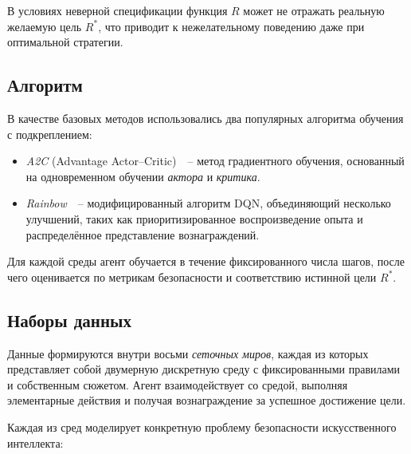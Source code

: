 В условиях неверной спецификации функция $R$ может не отражать реальную желаемую цель $R^*$, что приводит к нежелательному поведению даже при оптимальной стратегии.

\subsection{Алгоритм}

В качестве базовых методов использовались два популярных алгоритма обучения с подкреплением:
\begin{itemize}
    \item \emph{A2C} (Advantage Actor–Critic)~\cite{mnih2016a3c}~-- метод градиентного обучения, основанный на одновременном обучении \emph{актора} и \emph{критика}.
    \item \emph{Rainbow}~\cite{hessel2017rainbow}~-- модифицированный алгоритм DQN, объединяющий несколько улучшений, таких как приоритизированное воспроизведение опыта и распределённое представление вознаграждений.
\end{itemize}

Для каждой среды агент обучается в течение фиксированного числа шагов, после чего оценивается по метрикам безопасности и соответствию истинной цели $R^*$.

\subsection{Наборы данных}

Данные формируются внутри восьми \emph{сеточных миров}, каждая из которых представляет собой двумерную дискретную среду с фиксированными правилами и собственным сюжетом. Агент взаимодействует со средой, выполняя элементарные действия и получая вознаграждение за успешное достижение цели.  

Каждая из сред моделирует конкретную проблему безопасности искусственного интеллекта:

